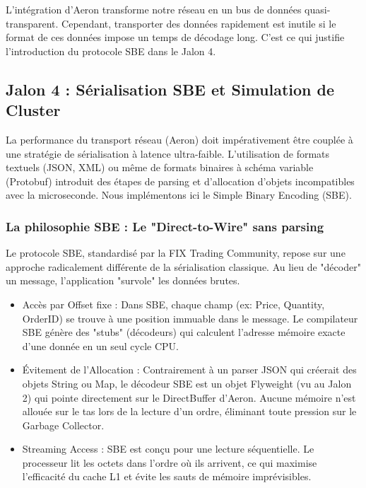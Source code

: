L'intégration d'Aeron transforme notre réseau en un bus de données quasi-transparent. Cependant, transporter des données rapidement est inutile si le format de ces données impose un temps de décodage long. C'est ce qui justifie l'introduction du protocole SBE dans le Jalon 4.

\subsection{Jalon 4 : Sérialisation SBE et Simulation de Cluster}

La performance du transport réseau (Aeron) doit impérativement être couplée à une stratégie de sérialisation à latence ultra-faible. L'utilisation de formats textuels (JSON, XML) ou même de formats binaires à schéma variable (Protobuf) introduit des étapes de parsing et d'allocation d'objets incompatibles avec la microseconde. Nous implémentons ici le Simple Binary Encoding (SBE).

\subsubsection{La philosophie SBE : Le "Direct-to-Wire" sans parsing}

Le protocole SBE, standardisé par la FIX Trading Community, repose sur une approche radicalement différente de la sérialisation classique. Au lieu de "décoder" un message, l'application "survole" les données brutes.

\begin{itemize}
    \item Accès par Offset fixe : Dans SBE, chaque champ (ex: Price, Quantity, OrderID) se trouve à une position immuable dans le message. Le compilateur SBE génère des "stubs" (décodeurs) qui calculent l'adresse mémoire exacte d'une donnée en un seul cycle CPU.
    \item Évitement de l'Allocation : Contrairement à un parser JSON qui créerait des objets String ou Map, le décodeur SBE est un objet Flyweight (vu au Jalon 2) qui pointe directement sur le DirectBuffer d'Aeron. Aucune mémoire n'est allouée sur le tas lors de la lecture d'un ordre, éliminant toute pression sur le Garbage Collector.
    \item Streaming Access : SBE est conçu pour une lecture séquentielle. Le processeur lit les octets dans l'ordre où ils arrivent, ce qui maximise l'efficacité du cache L1 et évite les sauts de mémoire imprévisibles.
\end{itemize}

